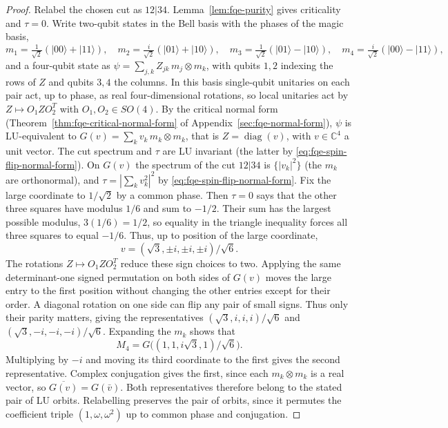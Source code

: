 \begin{proof} Relabel the chosen cut as \(12|34\). Lemma~\ref{lem:fqe-purity} gives criticality and
\(\tau=0\). Write two-qubit states in the Bell basis with the phases of the magic basis,
\[
m_1=\tfrac1{\sqrt2}(|00\rangle+|11\rangle),\quad
m_2=\tfrac{i}{\sqrt2}(|01\rangle+|10\rangle),\quad
m_3=\tfrac1{\sqrt2}(|01\rangle-|10\rangle),\quad
m_4=\tfrac{i}{\sqrt2}(|00\rangle-|11\rangle),
\]
and a four-qubit state as \(\psi=\sum_{j,k}Z_{jk}\,m_j\otimes m_k\), with qubits \(1,2\) indexing the rows of \(Z\) and
qubits \(3,4\) the columns. In this basis single-qubit unitaries on each pair act, up to phase, as real four-dimensional rotations, so
local unitaries act by \(Z\mapsto O_1ZO_2^T\) with \(O_1,O_2\in SO(4)\). By the critical normal form
(Theorem~\ref{thm:fqe-critical-normal-form} of Appendix~\ref{sec:fqe-normal-form}), \(\psi\) is LU-equivalent to \(G(v)=\sum_kv_k\,m_k\otimes m_k\), that is
\(Z=\operatorname{diag}(v)\), with \(v\in\mathbb C^4\) a unit vector. The
cut spectrum and \(\tau\) are LU invariant (the latter by
\eqref{eq:fqe-spin-flip-normal-form}). On \(G(v)\) the spectrum of the cut \(12|34\) is
\(\{|v_k|^2\}\) (the \(m_k\) are orthonormal), and \(\tau=|\sum_kv_k^2|^2\) by
\eqref{eq:fqe-spin-flip-normal-form}.
Fix the large coordinate to \(1/\sqrt2\) by a common phase. Then \(\tau=0\) says that the other three
squares have modulus \(1/6\) and sum to \(-1/2\). Their sum has the largest possible modulus,
\(3(1/6)=1/2\), so equality in the triangle inequality forces all three squares to equal \(-1/6\). Thus, up to position of the large coordinate,
\[
 v=(\sqrt3,\pm i,\pm i,\pm i)/\sqrt6.
\]
The rotations \(Z\mapsto O_1ZO_2^T\) reduce these sign choices to two.
Applying the same determinant-one signed permutation on both sides of $G(v)$
moves the large entry to the first position without changing the other entries
except for their order. A diagonal rotation on one side can flip any pair of
small signs. Thus only their parity matters, giving the representatives
$(\sqrt3,i,i,i)/\sqrt6$ and $(\sqrt3,-i,-i,-i)/\sqrt6$.
Expanding the $m_k$ shows that
\[
 M_4=G\bigl((1,1,i\sqrt3,1)/\sqrt6\bigr).
\]
Multiplying by $-i$ and moving its third coordinate to the first gives the second representative.
Complex conjugation gives the first, since each $m_k\otimes m_k$ is a real vector, so $\overline{G(v)}=G(\bar v)$. Both representatives therefore belong to the stated pair
of LU orbits.
Relabelling preserves the pair of orbits, since it permutes the coefficient triple
\((1,\omega,\omega^2)\) up to common phase and conjugation.
\end{proof}

